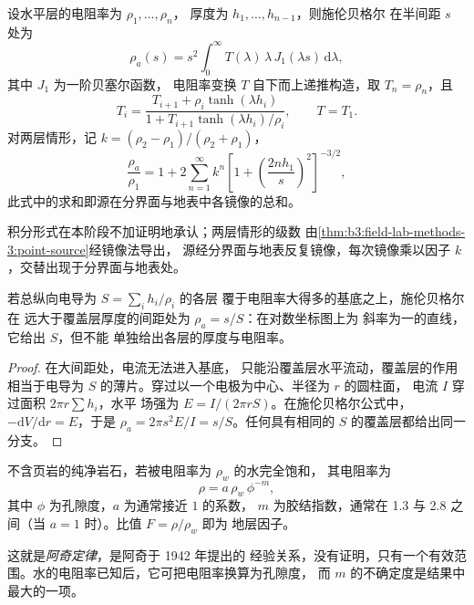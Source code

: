 \begin{proposition}[层状地层上的测深]\label{prop:b3:field-lab-methods-3:layers}
设水平层的电阻率为 $\rho_1, \dots, \rho_n$，
厚度为 $h_1, \dots, h_{n-1}$，则施伦贝格尔
在半间距 $s$ 处为
\[
\rho_a(s) = s^2\int_0^\infty T(\lambda)\,\lambda\,J_1(\lambda s)\,\mathrm{d}\lambda ,
\]
其中 $J_1$ 为一阶贝塞尔函数，
电阻率变换 $T$ 自下而上递推构造，取 $T_n = \rho_n$，且
\[
T_i = \frac{T_{i+1} + \rho_i\tanh(\lambda h_i)}{1 + T_{i+1}\tanh(\lambda h_i)/\rho_i} ,
\qquad T = T_1 .
\]
对两层情形，记 $k = (\rho_2 - \rho_1)/(\rho_2 + \rho_1)$，
\[
\frac{\rho_a}{\rho_1} = 1 + 2\sum_{n=1}^{\infty} k^n
  \left[1 + \left(\frac{2nh_1}{s}\right)^2\right]^{-3/2} ,
\]
此式中的求和即源在分界面与地表中各镜像的总和。
\end{proposition}
积分形式在本阶段不加证明地承认；两层情形的级数
由\cref{thm:b3:field-lab-methods-3:point-source}经镜像法导出，
源经分界面与地表反复镜像，每次镜像乘以因子 $k$
，交替出现于分界面与地表处。

\begin{proposition}[绝缘基底上的导电覆盖层]\label{prop:b3:field-lab-methods-3:conductance}
若总纵向电导为 $S = \sum_i h_i/\rho_i$ 的各层
覆于电阻率大得多的基底之上，施伦贝格尔在
远大于覆盖层厚度的间距处为 $\rho_a = s/S$：在对数坐标图上为
斜率为一的直线，它给出 $S$，但不能
单独给出各层的厚度与电阻率。
\end{proposition}

\begin{proof}
在大间距处，电流无法进入基底，
只能沿覆盖层水平流动，覆盖层的作用
相当于电导为 $S$ 的薄片。穿过以一个电极为中心、半径为 $r$ 的圆柱面，
电流 $I$ 穿过面积 $2\pi r\sum h_i$，水平
场强为 $E = I/(2\pi rS)$。在施伦贝格尔公式中，$-\mathrm{d}V/
\mathrm{d}r = E$，于是 $\rho_a = 2\pi s^2 E/I = s/S$。任何具有相同的
$S$ 的覆盖层都给出同一分支。
\end{proof}

\begin{proposition}[阿奇定律]\label{prop:b3:field-lab-methods-3:archie}
不含页岩的纯净岩石，若被电阻率为 $\rho_w$ 的水完全饱和，
其电阻率为
\[
\rho = a\,\rho_w\,\phi^{-m} ,
\]
其中 $\phi$ 为孔隙度，$a$ 为通常接近 $1$ 的系数，
$m$ 为胶结指数，通常在 \num{1.3} 与
\num{2.8} 之间（当 $a = 1$ 时）。比值 $F = \rho/\rho_w$ 即为
地层因子。
\end{proposition}
这就是\emph{阿奇定律}，是阿奇于 1942 年提出的
经验关系，没有证明，只有一个有效范围。水的电阻率已知后，它可把电阻率换算为孔隙度，
而 $m$ 的不确定度是结果中最大的一项。

